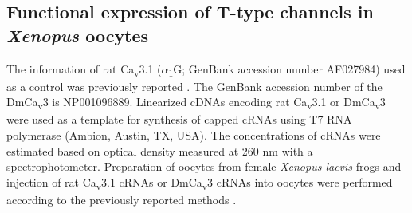 \subsection*{Functional expression of T-type channels in \emph{Xenopus} oocytes}

The information of rat Ca\textsubscript{v}3.1 ($\alpha$\textsubscript{1}G; GenBank accession number AF027984) used as a control was previously reported \cite{9495342}.
The GenBank accession number of the DmCa\textsubscript{v}3 is NP001096889.
Linearized cDNAs encoding rat Ca\textsubscript{v}3.1 or DmCa\textsubscript{v}3 were used as a template for synthesis of capped cRNAs using T7 RNA polymerase (Ambion, Austin, TX, USA).
The concentrations of cRNAs were estimated based on optical density measured at 260 nm with a spectrophotometer.
Preparation of oocytes from female \emph{Xenopus laevis} frogs and injection of rat Ca\textsubscript{v}3.1 cRNAs or DmCa\textsubscript{v}3 cRNAs into oocytes were performed according to the previously reported methods \cite{16377633}.
    
    
  
  
  
  